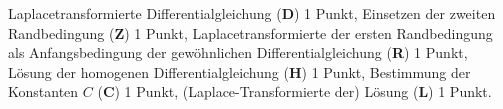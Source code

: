 
\begin{bewertung}
Laplacetransformierte Differentialgleichung ({\bf D}) 1 Punkt,
Einsetzen der zweiten Randbedingung ({\bf Z}) 1 Punkt,
Laplacetransformierte der ersten Randbedingung als Anfangsbedingung
der gewöhnlichen Differentialgleichung ({\bf R}) 1 Punkt,
Lösung der homogenen Differentialgleichung ({\bf H}) 1 Punkt,
Bestimmung der Konstanten $C$ ({\bf C}) 1 Punkt,
(Laplace-Transformierte der) Lösung ({\bf L}) 1 Punkt.
\end{bewertung}
